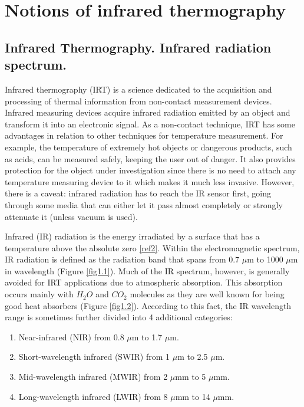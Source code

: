\pagestyle{standard}

\chapter{Notions of infrared thermography}\label{chapter1}

	\thispagestyle{chapter-first-page}
	
	\section{Infrared Thermography. Infrared radiation spectrum.}\label{section1.1}
	
		Infrared thermography (IRT) is a science dedicated to the acquisition and processing of thermal information from non-contact measurement devices. Infrared measuring devices acquire infrared radiation emitted by an object and transform it into an electronic signal. As a non-contact technique, IRT has some advantages in relation to other techniques for temperature measurement. For example, the temperature of extremely hot objects or dangerous products, such as acids, can be measured safely, keeping the user out of danger. It also provides protection for the object under investigation since there is no need to attach any temperature measuring device to it which makes it much less invasive. However, there is a caveat: infrared radiation has to reach the IR sensor first, going through some media that can either let it pass almost completely or strongly attenuate it (unless vacuum is used).
		
		Infrared (IR) radiation is the energy irradiated by a surface that has a temperature above the absolute zero \ref{ref2}. Within the electromagnetic spectrum, IR radiation is defined as the radiation band that spans from 0.7 $\mu$m to 1000 $\mu$m in wavelength (Figure \ref{fig1.1}). Much of the IR spectrum, however, is generally avoided for IRT applications due to atmospheric absorption. This absorption occurs mainly with $H_{2}O$ and $CO_{2}$ molecules as they are well known for being good heat absorbers (Figure \ref{fig1.2}). According to this fact, the IR wavelength range is sometimes further divided into 4 additional categories:

		\begin{enumerate}[label={\Roman*.}]
			\item Near-infrared (NIR) from 0.8 $\mu$m to 1.7 $\mu$m.
			\item Short-wavelength infrared (SWIR) from 1 $\mu$m to 2.5 $\mu$m.
			\item Mid-wavelength infrared (MWIR) from 2 $\mu$mm to 5 $\mu$mm.
			\item Long-wavelength infrared (LWIR) from 8 $\mu$mm to 14 $\mu$mm.
		\end{enumerate}
		
